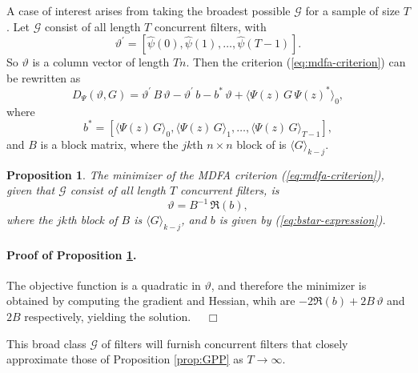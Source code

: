 \documentclass[a4paper]{book}
\def\tends{\rightarrow}
\newtheorem{Proposition}{Proposition}
\begin{document}
A   case of interest arises from taking the broadest possible $\mathcal{G}$
 for a sample of size $T$.
 Let $\mathcal{G}$ consist of all length $T$ concurrent filters, with 
\[
\vartheta^{\prime}  =  \left[ {\widehat{\psi} (0) }, 
  {\widehat{\psi} (1) }^{}, \ldots,   {\widehat{\psi} (T-1) }^{} \right].
\]
 So $\vartheta$ is a column vector of length $T n$.  Then the 
criterion (\ref{eq:mdfa-criterion})
 can be rewritten as
\[
 D_{\Psi} (\vartheta, G)  = \vartheta^{\prime} \, B \, \vartheta - \vartheta^{\prime} \, b - 
   b^* \, \vartheta + { \langle \Psi (z) \, G \, { \Psi (z) }^* \rangle }_0,
\]
 where 
\begin{equation}
 \label{eq:bstar-expression}
  b^*  = \left[ { \langle \Psi (z) \, G \rangle }_{0}, { \langle \Psi (z) \, G \rangle }_{1},
  \ldots, { \langle \Psi (z) \, G \rangle }_{T-1} \right],
\end{equation}
  and $B$ is a block matrix, where the $jk$th $n \times n$ block of  is 
  ${ \langle G \rangle }_{k-j}$.

\begin{Proposition}
\label{prop:mdfa.quadsoln}
 The minimizer of the MDFA criterion (\ref{eq:mdfa-criterion}),
  given that $\mathcal{G}$ consist of all length $T$ concurrent filters,
  is
\[
 \vartheta = B^{-1} \, \Re (b),
\]
 where the $jk$th  block of $B$   is    ${ \langle G \rangle }_{k-j}$,
 and $b$ is given by (\ref{eq:bstar-expression}).
\end{Proposition}

\paragraph{Proof of Proposition \ref{prop:mdfa.quadsoln}.}
 The objective function is a quadratic in $\vartheta$, and therefore
  the minimizer is obtained 
 by computing the gradient and Hessian, whih are 
  $-2 \Re (b) + 2 B \, \vartheta$ and   $2 B$ respectively,
  yielding the solution. $\quad \Box$

\vspace{.5cm}

   This broad class $\mathcal{G}$ of filters
  will furnish concurrent filters that closely approximate those of
 Proposition \ref{prop:GPP} as $ T \tends \infty$.
\end{document}
